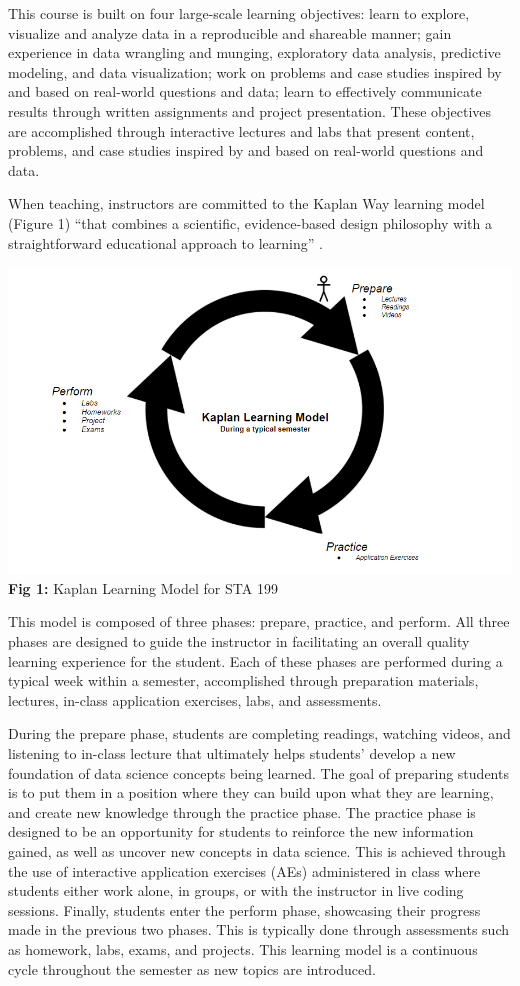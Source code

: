 \documentclass[
  12pt]{article}
\begin{document}
This course is built on four large-scale learning objectives: learn to
explore, visualize and analyze data in a reproducible and shareable
manner; gain experience in data wrangling and munging, exploratory data
analysis, predictive modeling, and data visualization; work on problems
and case studies inspired by and based on real-world questions and data;
learn to effectively communicate results through written assignments and
project presentation. These objectives are accomplished through
interactive lectures and labs that present content, problems, and case
studies inspired by and based on real-world questions and data.

When teaching, instructors are committed to the Kaplan Way learning
model (Figure 1) ``that combines a scientific, evidence-based design
philosophy with a straightforward educational approach to learning''
\citep[pg. 3]{schweser_2023}.

\includegraphics{images/Kaplan.png} \textbf{Fig 1:} Kaplan Learning
Model for STA 199

This model is composed of three phases: prepare, practice, and perform.
All three phases are designed to guide the instructor in facilitating an
overall quality learning experience for the student. Each of these
phases are performed during a typical week within a semester,
accomplished through preparation materials, lectures, in-class
application exercises, labs, and assessments.

During the prepare phase, students are completing readings, watching
videos, and listening to in-class lecture that ultimately helps
students' develop a new foundation of data science concepts being
learned. The goal of preparing students is to put them in a position
where they can build upon what they are learning, and create new
knowledge through the practice phase. The practice phase is designed to
be an opportunity for students to reinforce the new information gained,
as well as uncover new concepts in data science. This is achieved
through the use of interactive application exercises (AEs) administered
in class where students either work alone, in groups, or with the
instructor in live coding sessions. Finally, students enter the perform
phase, showcasing their progress made in the previous two phases. This
is typically done through assessments such as homework, labs, exams, and
projects. This learning model is a continuous cycle throughout the
semester as new topics are introduced.
\end{document}
